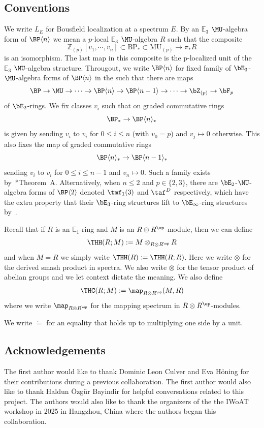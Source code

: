 \subsection{Conventions}
We write $L_{E}$ for Bousfield localization at a spectrum $E$. By an $
\mathbb{E}_{3}$ $\MU$-algebra form of $\BP\langle n\rangle$ we mean a $p$-local $\mathbb{E}_{3}$ $\MU$-algebra $R$ such that
the composite
\[ \mathbb{Z}_{(p)}[v_1,\cdots ,v_n]\subset \mathrm{BP}_*\subset \mathrm{MU}_{(p)}\to \pi_*R
\]
is an isomorphism. The last map in this composite is the p-localized unit of the $\mathbb{E}_3$ $\MU$-algebra
structure. Througout, we write $\BP\langle n\rangle$ for fixed family of $\bE_3$-$\MU$-algebra forms of $\BP\langle n\rangle$ in the such that there are maps
\[
\BP\to \MU \to  \dots \to \BP\langle n\rangle\to  \BP\langle n-1\rangle\to  \dots  \to \bZ_{(p)}\to \bF_{p}
\]
of $\bE_2$-rings. 
We fix classes $v_i$ such that on graded commutative rings
\[
\BP_*\to  \BP\langle n\rangle_*
\]
is given by sending $v_i$ to $v_i$ for $0\le i\le n$ (with $v_0=p$) and $v_j\mapsto 0$ otherwise. 
This also fixes the map of graded commutative rings 
\[  
    \BP\langle n\rangle_*\to  \BP\langle n-1\rangle_*
\]
sending $v_i$ to $v_i$ for $0\le i\le n-1$ and $v_n\mapsto 0$. Such a family exists by~\cite{HW22}*{Theorem~A}. 
Alternatively, when $n\le 2$ and $p\in \{2,3\}$, there are $\bE_2$-$\MU$-algebra forms of $\BP\langle 2\rangle$ denoted $\tmf_1(3)$ and $\taf^{D}$ respectively, which have the extra property that their $\bE_3$-ring structures lift to $\bE_\infty$-ring structures by~\cites{HL10,LN12,LN14,CM15}. 

Recall that if $R$ is an $\mathbb{E}_1$-ring and $M$ is an $R\otimes R^{\op}$-module, then we can define 
\[ 
\THH(R;M):=M\otimes_{R\otimes R^{\op}}R
\]
and when $M=R$ we simply write $\THH(R):=\THH(R;R)$. Here we write $\otimes$ for the derived smash product in spectra. We also write $\otimes$ for the tensor product of abelian groups and we let context dictate the meaning. We also define 
\[ 
\THC(R;M):=\map_{R\otimes R^{\op}}(M,R)
\]
where we write $\map_{R\otimes R^{\op}}$ for the mapping spectrum in $R\otimes R^{\op}$-modules. 

We write $\dot{=}$ for an equality that holds up to multiplying one side by a unit. 

\subsection{Acknowledgements}
The first author would like to thank Dominic Leon Culver and Eva H\"oning for their contributions during a previous collaboration. The first author would also like to thank Haldun \"Ozg\"ur Bayindir for helpful conversations related to this project. The authors would also like to thank the organizers of the the IWoAT workshop in 2025 in Hangzhou, China where the authors began this collaboration. 
